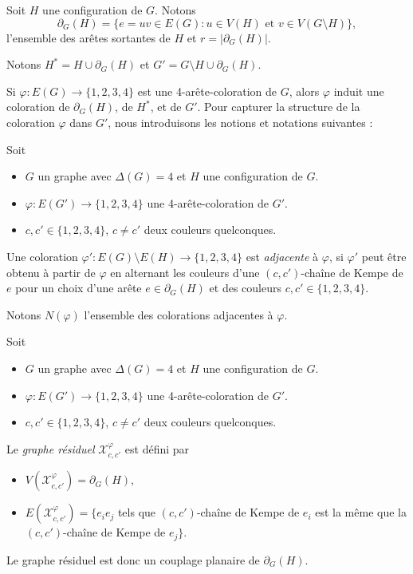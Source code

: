 \documentclass{beamer}
\begin{document}
\begin{frame}
Soit $H$ une configuration de $G$. Notons
$$
\partial_G(H) = \{e =uv \in E(G) : u \in V(H)\textrm{ et }v \in V(G \setminus H)\},
$$ 
l'ensemble des arêtes sortantes de $H$ et $r=|\partial_G(H)|$.
\pause

Notons $H^* = H \cup \partial_G(H)$ et $G'=G\setminus H \cup \partial_G(H)$.
\end{frame}

\begin{frame}
Si $\varphi:E(G)\to \{1,2,3,4\}$ est une 4-arête-coloration de $G$, alors $\varphi$ induit une coloration de $\partial_G(H)$, de $H^*$, et de $G'$. Pour capturer la structure de la coloration $\varphi$ dans $G'$, nous introduisons les notions et notations suivantes :
\end{frame}

\begin{frame}
Soit 
\begin{itemize}
\item $G$ un graphe avec $\Delta(G)=4$ et $H$ une configuration de $G$.
\item $\varphi:E(G')\to \{1,2,3,4\}$ une 4-arête-coloration de $G'$. 
\item $c, c' \in \{1,2,3,4\}$, $c\ne c'$ deux couleurs quelconques. 
\end{itemize}

Une coloration $\varphi':E(G)\setminus E(H)\to \{1,2,3,4\}$ est \emph{adjacente} à $\varphi$, si $\varphi'$ peut être obtenu à partir de $\varphi$ en alternant les couleurs d'une $(c,c')$-chaîne de Kempe de $e$ pour un choix d'une arête $e\in\partial_G(H)$ et des couleurs $c,c'\in\{1,2,3,4\}$. 

Notons $N(\varphi)$ l'ensemble des colorations adjacentes à $\varphi$.
\end{frame}

\begin{frame}
Soit 
\begin{itemize}
\item $G$ un graphe avec $\Delta(G)=4$ et $H$ une configuration de $G$.
\item $\varphi:E(G')\to \{1,2,3,4\}$ une 4-arête-coloration de $G'$. 
\item $c, c' \in \{1,2,3,4\}$, $c\ne c'$ deux couleurs quelconques. 
\end{itemize}

\pause


Le \emph{graphe résiduel}
$\mathcal{X}^{\varphi}_{c,c'}$ est défini par
\begin{itemize}
\item $V(\mathcal{X}^{\varphi}_{c,c'}) = \partial_G(H)$, 
\item $E(\mathcal{X}^{\varphi}_{c,c'}) = \{ e_ie_j$ tels que $(c,c')$-chaîne de Kempe de $e_i$ est la même que la $(c,c')$-chaîne de Kempe de $e_j\}$.
\end{itemize}

\pause

Le graphe résiduel est donc un couplage planaire de $\partial_G(H)$.
\end{frame}
\end{document}
